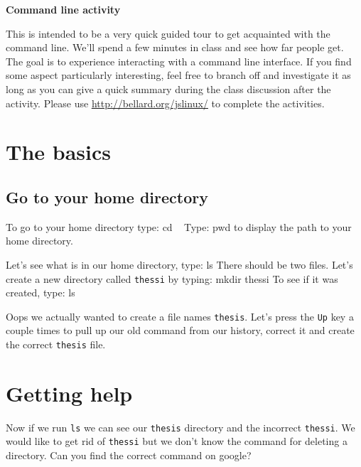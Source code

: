 \documentclass[12pt]{article}
\newenvironment{cmd}{\verbatim}{\endverbatim\vspace{3pt}}
\begin{document}
\begin{center}
\Large{\textbf{Command line activity}}\\
\end{center}

This is intended to be a very quick guided tour to get acquainted with the command line. We'll spend a few minutes in class and see how far people get. The goal is to experience interacting with a command line interface. If you find some aspect particularly interesting, feel free to branch off and investigate it as long as you can give a quick summary during the class discussion after the activity. Please use \underline{\url{http://bellard.org/jslinux/}} to complete the activities.


\section{The basics}
\subsection{Go to your home directory}
To go to your home directory type:
\begin{cmd}
  cd ~
\end{cmd}
Type:
\begin{cmd}
  pwd
\end{cmd}
to display the path to your home directory. %

Let's see what is in our home directory, type:
\begin{cmd}
  ls
\end{cmd}
There should be two files.  Let's create a new directory called \texttt{thessi} by typing:
\begin{cmd}
  mkdir thessi
\end{cmd}
To see if it was created, type:
\begin{cmd}
  ls
\end{cmd}

Oops we actually wanted to create a file names \texttt{thesis}. Let's press the \texttt{Up} key a couple times to pull up our old command from our history, correct it and create the correct \texttt{thesis} file.

\section{Getting help}
Now if we run \texttt{ls} we can see our \texttt{thesis} directory and the incorrect \texttt{thessi}. We would like to get rid of \texttt{thessi} but we don't know the command for deleting a directory. Can you find the correct command on google?
\vspace{.4in}
\end{document}
